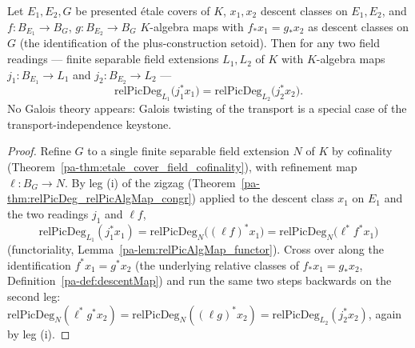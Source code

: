 \begin{theorem}
  \label{pa-thm:relPicDeg_eq_of_descentMap_eq}
  \leanok

  Let \(E_1, E_2, G\) be presented \'etale covers of \(K\), \(x_1, x_2\) descent classes on
  \(E_1, E_2\), and \(f \colon B_{E_1} \to B_G\), \(g \colon B_{E_2} \to B_G\) \(K\)-algebra
  maps with \(f_{*} x_1 = g_{*} x_2\) as descent classes on \(G\) (the identification of the
  plus-construction setoid). Then for any two field readings — finite separable field
  extensions \(L_1, L_2\) of \(K\) with \(K\)-algebra maps \(j_1 \colon B_{E_1} \to L_1\) and
  \(j_2 \colon B_{E_2} \to L_2\) —
  \[
    \mathrm{relPicDeg}_{L_1}\bigl(j_1^{*} x_1\bigr)
      = \mathrm{relPicDeg}_{L_2}\bigl(j_2^{*} x_2\bigr).
  \]
  No Galois theory appears: Galois twisting of the transport is a special case of the
  transport-independence keystone.
\end{theorem}
\begin{proof}
  \leanok
  Refine \(G\) to a single finite separable field extension \(N\) of \(K\) by cofinality
  (Theorem~\ref{pa-thm:etale_cover_field_cofinality}), with refinement map
  \(\ell \colon B_G \to N\). By leg (i) of the zigzag
  (Theorem~\ref{pa-thm:relPicDeg_relPicAlgMap_congr}) applied to the descent class \(x_1\) on
  \(E_1\) and the two readings \(j_1\) and \(\ell f\),
  \[
    \mathrm{relPicDeg}_{L_1}(j_1^{*} x_1) = \mathrm{relPicDeg}_{N}\bigl((\ell f)^{*} x_1\bigr)
      = \mathrm{relPicDeg}_{N}\bigl(\ell^{*} f^{*} x_1\bigr)
  \]
  (functoriality, Lemma~\ref{pa-lem:relPicAlgMap_functor}). Cross over along the identification
  \(f^{*} x_1 = g^{*} x_2\) (the underlying relative classes of \(f_{*}x_1 = g_{*}x_2\),
  Definition~\ref{pa-def:descentMap}) and run the same two steps backwards on the second leg:
  \(\mathrm{relPicDeg}_{N}(\ell^{*} g^{*} x_2) = \mathrm{relPicDeg}_{N}((\ell g)^{*} x_2) =
  \mathrm{relPicDeg}_{L_2}(j_2^{*} x_2)\), again by leg (i).
\end{proof}

